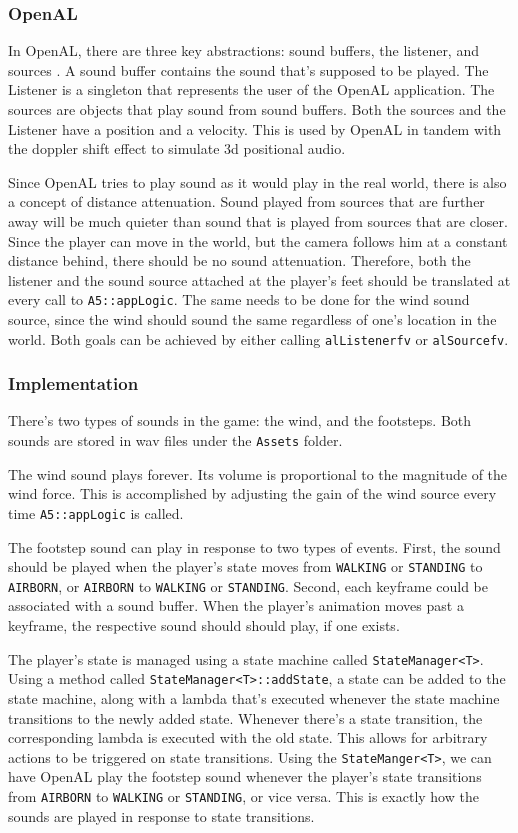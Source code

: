 \documentclass[11pt]{report}
\begin{document}
\subsubsection{OpenAL}
In OpenAL, there are three key abstractions: sound buffers, the listener, and sources \cite{open-al}. A sound buffer contains the sound that's supposed to be played. The Listener is a singleton that represents the user of the OpenAL application. The sources are objects that play sound from sound buffers. Both the sources and the Listener have a position and a velocity. This is used by OpenAL in tandem with the doppler shift effect to simulate 3d positional audio.

Since OpenAL tries to play sound as it would play in the real world, there is also a concept of distance attenuation. Sound played from sources that are further away will be much quieter than sound that is played from sources that are closer. Since the player can move in the world, but the camera follows him at a constant distance behind, there should be no sound attenuation. Therefore, both the listener and the sound source attached at the player's feet should be translated at every call to \verb|A5::appLogic|. The same needs to be done for the wind sound source, since the wind should sound the same regardless of one's location in the world. Both goals can be achieved by either calling \verb|alListenerfv| or \verb|alSourcefv|.

\subsubsection{Implementation}
There's two types of sounds in the game: the wind, and the footsteps. Both sounds are stored in wav files under the \verb|Assets| folder.

The wind sound plays forever. Its volume is proportional to the magnitude of the wind force. This is accomplished by adjusting the gain of the wind source every time \verb|A5::appLogic| is called.

The footstep sound can play in response to two types of events. First, the sound should be played when the player's state moves from \verb|WALKING| or \verb|STANDING| to \verb|AIRBORN|, or \verb|AIRBORN| to \verb|WALKING| or \verb|STANDING|. Second, each keyframe could be associated with a sound buffer. When the player's animation moves past a keyframe, the respective sound should should play, if one exists.

The player's state is managed using a state machine called \verb|StateManager<T>|. Using a method called \verb|StateManager<T>::addState|, a state can be added to the state machine, along with a lambda that's executed whenever the state machine transitions to the newly added state. Whenever there's a state transition, the corresponding lambda is executed with the old state. This allows for arbitrary actions to be triggered on state transitions. Using the \verb|StateManger<T>|, we can have OpenAL play the footstep sound whenever the player's state transitions from \verb|AIRBORN| to \verb|WALKING| or \verb|STANDING|, or vice versa. This is exactly how the sounds are played in response to state transitions.
\end{document}
